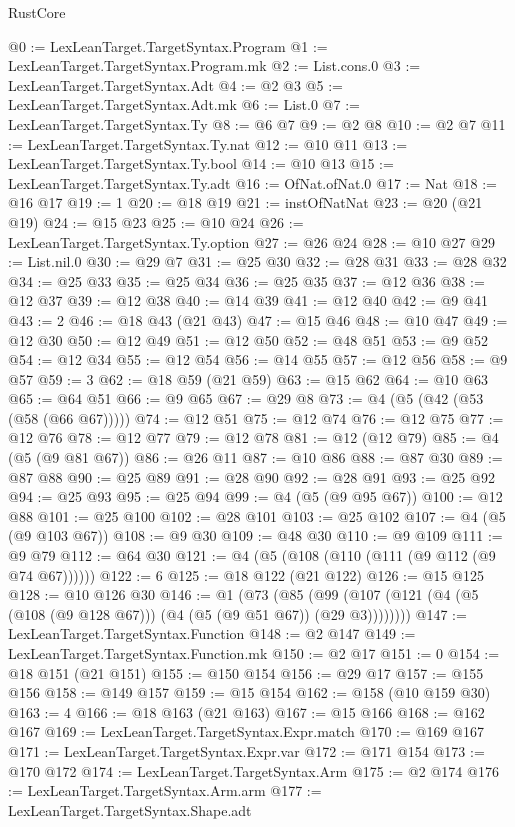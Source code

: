 \begin{lexlean}{RustCore}
\begin{coremodule}
@0 := LexLeanTarget.TargetSyntax.Program
@1 := LexLeanTarget.TargetSyntax.Program.mk
@2 := List.cons.{0}
@3 := LexLeanTarget.TargetSyntax.Adt
@4 := @2 @3
@5 := LexLeanTarget.TargetSyntax.Adt.mk
@6 := List.{0}
@7 := LexLeanTarget.TargetSyntax.Ty
@8 := @6 @7
@9 := @2 @8
@10 := @2 @7
@11 := LexLeanTarget.TargetSyntax.Ty.nat
@12 := @10 @11
@13 := LexLeanTarget.TargetSyntax.Ty.bool
@14 := @10 @13
@15 := LexLeanTarget.TargetSyntax.Ty.adt
@16 := OfNat.ofNat.{0}
@17 := Nat
@18 := @16 @17
@19 := 1
@20 := @18 @19
@21 := instOfNatNat
@23 := @20 (@21 @19)
@24 := @15 @23
@25 := @10 @24
@26 := LexLeanTarget.TargetSyntax.Ty.option
@27 := @26 @24
@28 := @10 @27
@29 := List.nil.{0}
@30 := @29 @7
@31 := @25 @30
@32 := @28 @31
@33 := @28 @32
@34 := @25 @33
@35 := @25 @34
@36 := @25 @35
@37 := @12 @36
@38 := @12 @37
@39 := @12 @38
@40 := @14 @39
@41 := @12 @40
@42 := @9 @41
@43 := 2
@46 := @18 @43 (@21 @43)
@47 := @15 @46
@48 := @10 @47
@49 := @12 @30
@50 := @12 @49
@51 := @12 @50
@52 := @48 @51
@53 := @9 @52
@54 := @12 @34
@55 := @12 @54
@56 := @14 @55
@57 := @12 @56
@58 := @9 @57
@59 := 3
@62 := @18 @59 (@21 @59)
@63 := @15 @62
@64 := @10 @63
@65 := @64 @51
@66 := @9 @65
@67 := @29 @8
@73 := @4 (@5 (@42 (@53 (@58 (@66 @67)))))
@74 := @12 @51
@75 := @12 @74
@76 := @12 @75
@77 := @12 @76
@78 := @12 @77
@79 := @12 @78
@81 := @12 (@12 @79)
@85 := @4 (@5 (@9 @81 @67))
@86 := @26 @11
@87 := @10 @86
@88 := @87 @30
@89 := @87 @88
@90 := @25 @89
@91 := @28 @90
@92 := @28 @91
@93 := @25 @92
@94 := @25 @93
@95 := @25 @94
@99 := @4 (@5 (@9 @95 @67))
@100 := @12 @88
@101 := @25 @100
@102 := @28 @101
@103 := @25 @102
@107 := @4 (@5 (@9 @103 @67))
@108 := @9 @30
@109 := @48 @30
@110 := @9 @109
@111 := @9 @79
@112 := @64 @30
@121 := @4 (@5 (@108 (@110 (@111 (@9 @112 (@9 @74 @67))))))
@122 := 6
@125 := @18 @122 (@21 @122)
@126 := @15 @125
@128 := @10 @126 @30
@146 := @1
    (@73 (@85 (@99 (@107 (@121 (@4 (@5 (@108 (@9 @128 @67))) (@4 (@5 (@9 @51 @67)) (@29 @3))))))))
@147 := LexLeanTarget.TargetSyntax.Function
@148 := @2 @147
@149 := LexLeanTarget.TargetSyntax.Function.mk
@150 := @2 @17
@151 := 0
@154 := @18 @151 (@21 @151)
@155 := @150 @154
@156 := @29 @17
@157 := @155 @156
@158 := @149 @157
@159 := @15 @154
@162 := @158 (@10 @159 @30)
@163 := 4
@166 := @18 @163 (@21 @163)
@167 := @15 @166
@168 := @162 @167
@169 := LexLeanTarget.TargetSyntax.Expr.match
@170 := @169 @167
@171 := LexLeanTarget.TargetSyntax.Expr.var
@172 := @171 @154
@173 := @170 @172
@174 := LexLeanTarget.TargetSyntax.Arm
@175 := @2 @174
@176 := LexLeanTarget.TargetSyntax.Arm.arm
@177 := LexLeanTarget.TargetSyntax.Shape.adt

\end{coremodule}
\end{lexlean}

